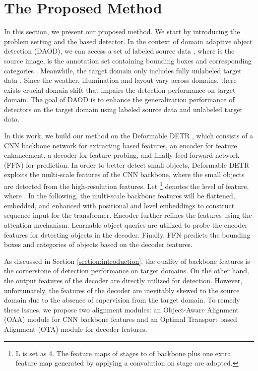 \documentclass[sigconf]{acmart}
\begin{document}
 \section{The Proposed Method}
In this section, we present our proposed method. We start by introducing the problem setting and the based detector. In the context of domain adaptive object detection (DAOD), we can access a set of labeled source data , where  is the source image,  is the annotation set containing  bounding boxes  and corresponding categories . Meanwhile, the target domain only includes fully unlabeled target data . Since the weather, illumination and layout vary across domains, there exists crucial domain shift that impairs the detection performance on target domain. The goal of DAOD is to enhance the generalization performance of detectors on the target domain using labeled source data and unlabeled target data.

In this work, we build our method on the Deformable DETR \cite{zhu2020deformable}, which consists of a CNN backbone network for extracting based features, an encoder for feature enhancement, a decoder for feature probing, and finally feed-forward network (FFN) for prediction. In order to better detect small objects, Deformable DETR exploits the multi-scale features of the CNN backbone, where the small objects are detected from the high-resolution features. Let \footnote{L is set as 4. The feature maps of stages  to  of backbone plus one extra feature map generated by applying a convolution on stage  are adopted.} denotes the  level of feature, where . In the following, the multi-scale backbone features will be flattened, embedded, and enhanced with positional and level embeddings \cite{zhu2020deformable} to construct sequence input for the transformer. Encoder further refines the features using the attention mechanism. Learnable object queries are utilized to probe the encoder features for detecting objects in the decoder. Finally, FFN predicts the bounding boxes and categories of objects based on the decoder features.

As discussed in Section \ref{section:introduction}, the quality of backbone features is the cornerstone of detection performance on target domains. On the other hand, the output features of the decoder are directly utilized for detection. However, unfortunately, the features of the decoder are inevitably skewed to the source domain due to the absence of supervision from the target domain. To remedy these issues, we propose two alignment modules: an Object-Aware Alignment (OAA) module for CNN backbone features and an Optimal Transport based Alignment (OTA) module for decoder features.
\end{document}
